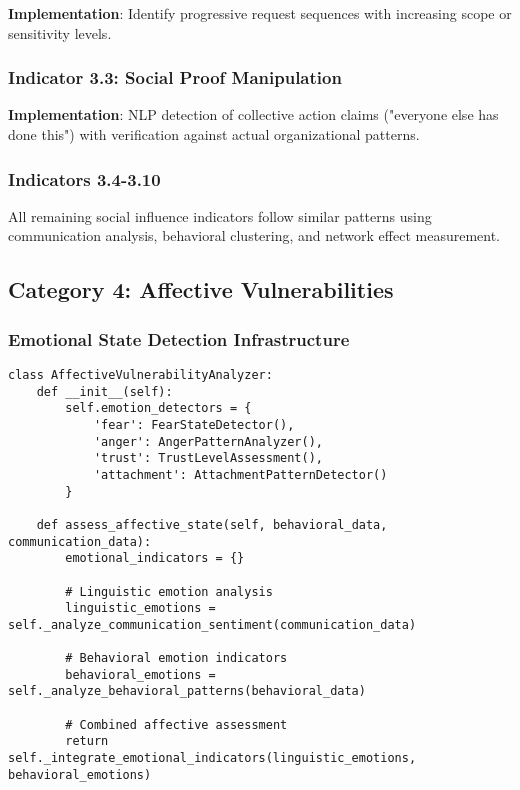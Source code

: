 \documentclass[11pt, onecolumn]{article}
\begin{document}
\textbf{Implementation}: Identify progressive request sequences with increasing scope or sensitivity levels.

\subsubsection{Indicator 3.3: Social Proof Manipulation}

\textbf{Implementation}: NLP detection of collective action claims ("everyone else has done this") with verification against actual organizational patterns.

\subsubsection{Indicators 3.4-3.10}

All remaining social influence indicators follow similar patterns using communication analysis, behavioral clustering, and network effect measurement.

\subsection{Category 4: Affective Vulnerabilities}

\subsubsection{Emotional State Detection Infrastructure}

\begin{lstlisting}
class AffectiveVulnerabilityAnalyzer:
    def __init__(self):
        self.emotion_detectors = {
            'fear': FearStateDetector(),
            'anger': AngerPatternAnalyzer(),
            'trust': TrustLevelAssessment(),
            'attachment': AttachmentPatternDetector()
        }
        
    def assess_affective_state(self, behavioral_data, communication_data):
        emotional_indicators = {}
        
        # Linguistic emotion analysis
        linguistic_emotions = self._analyze_communication_sentiment(communication_data)
        
        # Behavioral emotion indicators
        behavioral_emotions = self._analyze_behavioral_patterns(behavioral_data)
        
        # Combined affective assessment
        return self._integrate_emotional_indicators(linguistic_emotions, behavioral_emotions)
\end{lstlisting}
\end{document}

